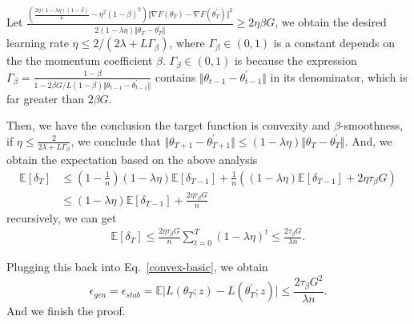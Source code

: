 Let $\frac{\left(\frac{2\eta (1-\lambda\eta)(1-\beta)}{L} -\eta^2(1-\beta)^2 \right) \Vert \nabla F(\theta_{T}) -\nabla F(\theta_{T}^{\prime})\Vert^2}{2(1-\lambda\eta)\Vert \theta_T- \theta_T^{\prime}\Vert} \geq  2\eta\beta G$, we obtain the desired learning rate $\eta \leq 2/(2\lambda+L\Gamma_{\beta})$, where $\Gamma_{\beta}\in(0,1)$ is a constant depends on the the momentum coefficient $\beta$. $\Gamma_{\beta}\in(0,1)$ is because the expression $\Gamma_{\beta}=\frac{1-\beta}{1-2\beta G/L(1-\beta)\Vert\theta_{t-1}-\theta_{t-1}^{\prime}\Vert}$ contains $\Vert\theta_{t-1}-\theta_{t-1}^{\prime}\Vert$ in its denominator, which is far greater than $2\beta G$. 

Then, we have the conclusion the target function is convexity and $\beta$-smoothness, if $\eta \leq \frac{2}{2\lambda+L\Gamma_{\beta}}$, we conclude that $\Vert \theta_{T+1} - \theta_{T+1}^{\prime}\Vert \leq (1-\lambda\eta)\Vert \theta_T- \theta_T^{\prime}\Vert$. And, we obtain the expectation based on the above analysis 
  \begin{equation}
  \begin{aligned}
    \mathbb{E}\left[\delta_{T}\right] &\leq (1-\frac{1}{n})(1-\lambda \eta)\mathbb{E}\left[\delta_{T-1}\right] + \frac{1}{n}\left((1-\lambda \eta)\mathbb{E}\left[\delta_{T-1}\right] + 2\eta\tau_{\beta} G\right)\\
    &\leq (1-\lambda \eta)\mathbb{E}\left[\delta_{T-1}\right] + \frac{2\eta\tau_{\beta} G}{n}
  \end{aligned}
 \end{equation}
recursively, we can get 
    \begin{equation}
     \begin{aligned}
      \mathbb{E}\left[\delta_{T}\right] \leq \frac{2\eta\tau_{\beta} G}{n} \sum_{t=0}^{T}(1-\lambda \eta)^t \leq \frac{2\tau_{\beta}G}{\lambda n}.
     \end{aligned}
    \end{equation}

Plugging this back into Eq.~\eqref{convex-basic}, we obtain
 \begin{equation}\label{eq:2.2.1}
  \epsilon_{gen} = \epsilon_{stab} = \mathbb{E}\vert L(\theta_T;z) - L(\theta^{\prime}_T;z)\vert \leq \frac{2\tau_{\beta}G^2}{\lambda n}.
 \end{equation}
And we finish the proof.


